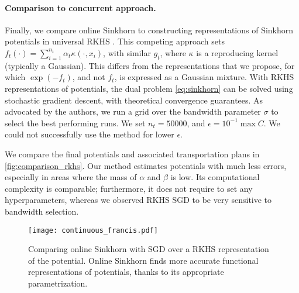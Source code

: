 \paragraph{Comparison to concurrent approach.} Finally, we compare online
Sinkhorn to constructing representations of Sinkhorn potentials in universal
RKHS \cite{2016-genevay-nips}. This competing approach sets $f_t(\cdot) =
\sum_{i=1}^{n_t} \alpha_t \kappa(\cdot, x_i)$, with similar $g_t$, where $\kappa$ is
a reproducing kernel (typically a Gaussian). This differs from the
representations that we propose, for which $\exp(-f_t)$, and not $f_t$, is
expressed as a Gaussian mixture. With RKHS representations of potentials, the
dual problem \eqref{eq:sinkhorn} can be solved using stochastic gradient
descent, with theoretical convergence guarantees. As advocated by the authors,
we run a grid over the bandwidth parameter $\sigma$ to select the best
performing runs. We set $n_t = 50000$, and $\epsilon = 10^{-1} \max C$. We could not successfully use the method for lower $\epsilon$.

We compare the final potentials and associated
transportation plans in \autoref{fig:comparison_rkhs}. Our method estimates
potentials with much less errors, especially in areas where the mass of $\alpha$
and $\beta$ is low. Its computational complexity is comparable; furthermore, it
does not require to set any hyperparameters, whereas we observed RKHS SGD to be
very sensitive to bandwidth selection.

\begin{figure}[t]
    \centering
    \texttt{[image: continuous\_francis.pdf]}
    \caption{Comparing online Sinkhorn with SGD over a RKHS representation of the potential. Online Sinkhorn finds more accurate functional representations of potentials, thanks to its appropriate parametrization.}
    \label{fig:comparison_rkhs}
\end{figure}